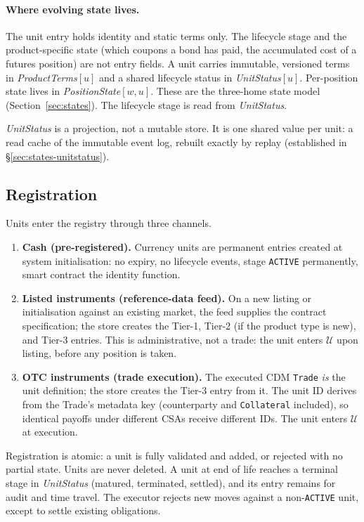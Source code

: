 \paragraph{Where evolving state lives.}
The unit entry holds identity and static terms only. The lifecycle stage and the product-specific state (which coupons a bond has paid, the accumulated cost of a futures position) are not entry fields. A unit carries immutable, versioned terms in \emph{ProductTerms}$[u]$ and a shared lifecycle status in \emph{UnitStatus}$[u]$. Per-position state lives in \emph{PositionState}$[w,u]$. These are the three-home state model (Section~\ref{sec:states}). The lifecycle stage is read from \emph{UnitStatus}.

\emph{UnitStatus} is a projection, not a mutable store. It is one shared value per unit: a read cache of the immutable event log, rebuilt exactly by replay (established in \S\ref{sec:states-unitstatus}).

\subsection{Registration}
\label{sec:unit-registration}

Units enter the registry through three channels.

\begin{enumerate}
\item \textbf{Cash (pre-registered).} Currency units are permanent entries created at system initialisation: no expiry, no lifecycle events, stage \texttt{ACTIVE} permanently, smart contract the identity function.
\item \textbf{Listed instruments (reference-data feed).} On a new listing or initialisation against an existing market, the feed supplies the contract specification; the store creates the Tier-1, Tier-2 (if the product type is new), and Tier-3 entries. This is administrative, not a trade: the unit enters $\mathcal{U}$ upon listing, before any position is taken.
\item \textbf{OTC instruments (trade execution).} The executed CDM \texttt{Trade} \emph{is} the unit definition; the store creates the Tier-3 entry from it. The unit ID derives from the Trade's metadata key (counterparty and \texttt{Collateral} included), so identical payoffs under different CSAs receive different IDs. The unit enters $\mathcal{U}$ at execution.
\end{enumerate}

Registration is atomic: a unit is fully validated and added, or rejected with no partial state. Units are never deleted. A unit at end of life reaches a terminal stage in \emph{UnitStatus} (matured, terminated, settled), and its entry remains for audit and time travel. The executor rejects new moves against a non-\texttt{ACTIVE} unit, except to settle existing obligations.

